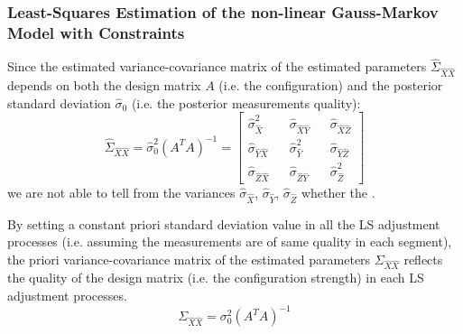 \subsubsection{Least-Squares Estimation of the non-linear Gauss-Markov Model with Constraints}
\label{subsubsec:LSadj}









Since the estimated variance-covariance matrix of the estimated parameters $\hat{\Sigma}_{\hat{X}\hat{X}}$ depends on both the design matrix $A$ (i.e. the configuration) and the posterior standard deviation $\hat{\sigma}_0$ (i.e. the posterior measurements quality):
\begin{equation}
\hat{\Sigma}_{\hat{X}\hat{X}}=\hat{\sigma}_0^2(A^TA)^{-1}=
\begin{bmatrix}
\hat{\sigma}_{\hat{X}}^2 && \hat{\sigma}_{\hat{X}\hat{Y}} && \hat{\sigma}_{\hat{X}\hat{Z}} \\
\hat{\sigma}_{\hat{Y}\hat{X}} && \hat{\sigma}_{\hat{Y}}^2 && \hat{\sigma}_{\hat{Y}\hat{Z}} \\
\hat{\sigma}_{\hat{Z}\hat{X}} && \hat{\sigma}_{\hat{Z}\hat{Y}} && \hat{\sigma}_{\hat{Z}}^2
\end{bmatrix}
\end{equation}
we are not able to tell from the variances $\hat{\sigma}_{\hat{X}}$, $\hat{\sigma}_{\hat{Y}}$, $\hat{\sigma}_{\hat{Z}}$ whether the .

By setting a constant priori standard deviation value in all the LS adjustment processes (i.e. assuming the measurements are of same quality in each segment), the priori variance-covariance matrix of the estimated parameters $\Sigma_{\hat{X}\hat{X}}$ reflects the quality of the design matrix (i.e. the configuration strength) in each LS adjustment processes.
\begin{equation}
\Sigma_{\hat{X}\hat{X}}=\sigma_0^2(A^TA)^{-1}
\end{equation}




